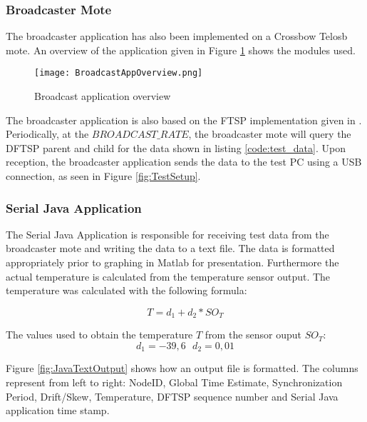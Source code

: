 \documentclass[Main]{subfiles}
\begin{document}
		
		\subsubsection{Broadcaster Mote} %
		\label{sub:broadcaster_mote}
			The broadcaster application has also been implemented on a Crossbow Telosb mote. 
			An overview of the application given in Figure \ref{fig:broadCastAppOverview} shows the modules used. 

			\begin{figure}[H]
				\centering
				\texttt{[image: BroadcastAppOverview.png]}
				\caption{Broadcast application overview}
				\label{fig:broadCastAppOverview}
			\end{figure}

			The broadcaster application is also based on the FTSP implementation given in \cite{FTSPImplementationTinyOS:Online}.	
			Periodically, at the $BROADCAST\_RATE$, the broadcaster mote will query the DFTSP parent and child for the data shown in listing \ref{code:test_data}.
			Upon reception, the broadcaster application sends the data to the test PC using a USB connection, as seen in Figure \ref{fig:TestSetup}.

	

		
		\subsubsection{Serial Java Application} %
		\label{sub:serial_java_application}
			The Serial Java Application is responsible for receiving test data from the broadcaster mote and writing the data to a text file.
			The data is formatted appropriately prior to graphing in Matlab for presentation.
			Furthermore the actual temperature is calculated from the temperature sensor output.
			The temperature was calculated with the following formula\cite{tempSensorDatasheet}:

			\begin{equation}
			T = d_1 + d_2 * SO_T
			\end{equation} 

			The values used to obtain the temperature $T$ from the sensor ouput $SO_T$:
			\begin{equation}
			d_1 = -39,6\ \ \ d_2 = 0,01
			\end{equation} 

			Figure \ref{fig:JavaTextOutput} shows how an output file is formatted.
			The columns represent from left to right: NodeID, Global Time Estimate, Synchronization Period, Drift/Skew, Temperature, DFTSP sequence number and Serial Java application time stamp.
			
\end{document}
